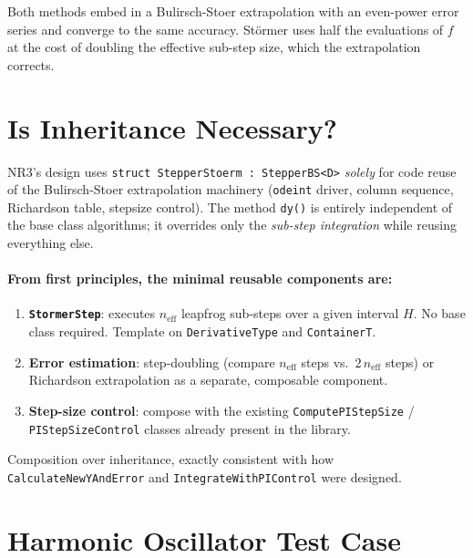 \documentclass[11pt]{article}
\begin{document}
Both methods embed in a Bulirsch-Stoer extrapolation with an even-power error
series and converge to the same accuracy.  Störmer uses half the evaluations of $f$
at the cost of doubling the effective sub-step size, which the extrapolation corrects.

\section{Is Inheritance Necessary?}

NR3's design uses \texttt{struct StepperStoerm : StepperBS<D>} \emph{solely} for
code reuse of the Bulirsch-Stoer extrapolation machinery (\texttt{odeint} driver,
column sequence, Richardson table, stepsize control).  The method \texttt{dy()} is
entirely independent of the base class algorithms; it overrides only the
\emph{sub-step integration} while reusing everything else.

\paragraph{From first principles, the minimal reusable components are:}
\begin{enumerate}
  \item \textbf{\texttt{StormerStep}}: executes $n_\text{eff}$ leapfrog sub-steps
        over a given interval $H$.  No base class required.  Template on
        \texttt{DerivativeType} and \texttt{ContainerT}.
  \item \textbf{Error estimation}: step-doubling (compare $n_\text{eff}$ steps vs.\
        $2\,n_\text{eff}$ steps) or Richardson extrapolation as a separate,
        composable component.
  \item \textbf{Step-size control}: compose with the existing
        \texttt{ComputePIStepSize} / \texttt{PIStepSizeControl} classes already
        present in the library.
\end{enumerate}

Composition over inheritance, exactly consistent with how
\texttt{CalculateNewYAndError} and \texttt{IntegrateWithPIControl} were designed.

\section{Harmonic Oscillator Test Case}
\end{document}
